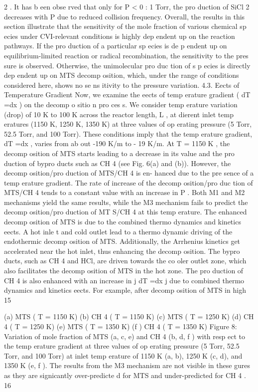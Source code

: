 \documentclass[10pt, letterpaper]{article}
\begin{document}
2
. It has b een obse rved that
only for
P <
0
:
1 Torr, the pro duction of SiCl
2
decreases with
P
due to reduced collision frequency.
Overall, the results in this section illustrate that the sensitivity of the mole fraction of various chemical
sp ecies under CVI-relevant conditions is highly dep endent up on the reaction pathways. If the pro duction of a
particular sp ecies is de p endent up on equilibrium-limited reaction or radical recombination, the sensitivity to
the pres sure is observed. Otherwise, the unimolecular pro duc tion of s p ecies is directly dep endent up on MTS
decomp osition, which, under the range of conditions considered here, shows no se ns itivity to the pressure
variation.
4.3. Eects of Temperature Gradient
Now, we examine the eects of temp erature gradient (
dT =dx
) on the decomp o sitio n pro ces s. We consider
temp erature variation (drop) of 10 K to 100 K across the reactor length,
L
, at dierent inlet temp eratures
(1150 K, 1250 K, 1350 K) at three values of op erating pressure (5 Torr, 52.5 Torr, and 100 Torr). These
conditions imply that the temp erature gradient,
dT =dx
, varies from ab out -190 K/m to - 19 K/m.
At
T
= 1150
K
, the decomp osition of MTS starts leading to a decrease in its value and the pro duction of
bypro ducts such as CH
4
(see Fig. 6(a) and (b)). However, the decomp osition/pro duction of MTS/CH
4
is en-
hanced due to the pre sence of a temp erature gradient. The rate of increase of the decomp osition/pro duc tion
of MTS/CH
4
tends to a constant value with an increase in
P
. Both M1 and M2 mechanisms yield the
same results, while the M3 mechanism fails to predict the decomp osition/pro duction of MT S/CH
4
at this
temp erature.
The enhanced decomp osition of MTS is due to the combined thermo dynamics and kinetics eects. A
hot inle t and cold outlet lead to a thermo dynamic driving of the endothermic decomp osition of MTS.
Additionally, the Arrhenius kinetics get accelerated near the hot inlet, thus enhancing the decomp osition.
The bypro ducts, such as CH
4
and HCl, are driven towards the co oler outlet zone, which also facilitates the
decomp osition of MTS in the hot zone. The pro duction of CH
4
is also enhanced with an increase in
j
dT =dx
j
due to combined thermo dynamics and kinetics eects. For example, after decomp osition of MTS in high
15


(a) MTS (
T
= 1150 K)
(b) CH
4
(
T
= 1150 K)
(c) MTS (
T
= 1250 K)
(d) CH
4
(
T
= 1250 K)
(e) MTS (
T
= 1350 K)
(f ) CH
4
(
T
= 1350 K)
Figure 8: Variation of mole fraction of MTS (a, c, e) and CH
4
(b, d, f ) with resp ect to the temp erature gradient at three values
of op erating pressure (5 Torr, 52.5 Torr, and 100 Torr) at inlet temp erature of 1150 K (a, b), 1250 K (c, d), and 1350 K (e,
f ). The results from the M3 mechanism are not visible in these gures as they are signicantly over-predicte d for MTS and
under-predicted for CH
4
.
16
\end{document}
